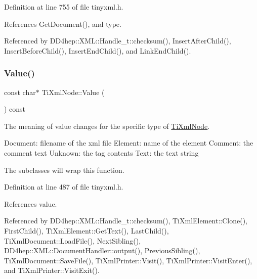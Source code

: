 Definition at line 755 of file tinyxml.\+h.



References Get\+Document(), and type.



Referenced by D\+D4hep\+::\+X\+M\+L\+::\+Handle\+\_\+t\+::checksum(), Insert\+After\+Child(), Insert\+Before\+Child(), Insert\+End\+Child(), and Link\+End\+Child().

\hypertarget{class_ti_xml_node_ad44dfe927d49a74dd78b72b7514417ad}{}\label{class_ti_xml_node_ad44dfe927d49a74dd78b72b7514417ad} 
\subsubsection{\texorpdfstring{Value()}{Value()}}
{\footnotesize\ttfamily const char$\ast$ Ti\+Xml\+Node\+::\+Value (\begin{DoxyParamCaption}{ }\end{DoxyParamCaption}) const\hspace{0.3cm}{\ttfamily [inline]}}

The meaning of \textquotesingle{}value\textquotesingle{} changes for the specific type of \hyperlink{class_ti_xml_node}{Ti\+Xml\+Node}. \begin{DoxyVerb}Document: filename of the xml file
Element:  name of the element
Comment:  the comment text
Unknown:  the tag contents
Text:             the text string
\end{DoxyVerb}


The subclasses will wrap this function. 

Definition at line 487 of file tinyxml.\+h.



References value.



Referenced by D\+D4hep\+::\+X\+M\+L\+::\+Handle\+\_\+t\+::checksum(), Ti\+Xml\+Element\+::\+Clone(), First\+Child(), Ti\+Xml\+Element\+::\+Get\+Text(), Last\+Child(), Ti\+Xml\+Document\+::\+Load\+File(), Next\+Sibling(), D\+D4hep\+::\+X\+M\+L\+::\+Document\+Handler\+::output(), Previous\+Sibling(), Ti\+Xml\+Document\+::\+Save\+File(), Ti\+Xml\+Printer\+::\+Visit(), Ti\+Xml\+Printer\+::\+Visit\+Enter(), and Ti\+Xml\+Printer\+::\+Visit\+Exit().

\hypertarget{class_ti_xml_node_a74bda074919e4a5e08d700204793f898}{}\label{class_ti_xml_node_a74bda074919e4a5e08d700204793f898} 
